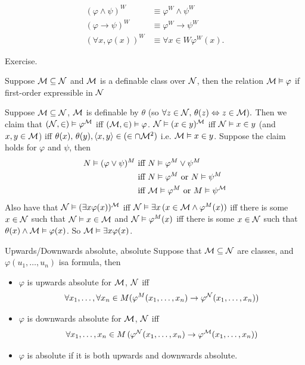 \documentclass{article}
\begin{document}
\begin{fancyprop}{}
    \begin{align*}
        (\varphi \wedge \psi)^{W}      & \equiv \varphi^{W} \wedge \psi^{W}      \\
        (\varphi \rightarrow \psi)^{W} & \equiv \varphi^{W} \rightarrow \psi^{W} \\
        (\forall x, \varphi(x))^{W}    & \equiv \forall x \in W \varphi^{W}(x).
    \end{align*}
\end{fancyprop}
\proof Exercise.
\endproof
\begin{fancyprop}{}
    Suppose $\mathcal{M} \subseteq \mathcal{N}$ and $\mathcal{M}$ is a definable class over $\mathcal{N}$, then the relation $\mathcal{M} \vDash \varphi$ if first-order expressible in $\mathcal{N}$
\end{fancyprop}
\proof Suppose $\mathcal{M} \subseteq \mathcal{N}$, $\mathcal{M}$ is definable by $\theta$ (so $\forall z \in \mathcal{N}, \, \theta(z) \Leftrightarrow z \in \mathcal{M}).$ \gap
Then we claim that $(\mathcal{N}, \in) \vDash \varphi^{\mathcal{M}}$ iff $(\mathcal{M}, \in) \vDash \varphi$. $\mathcal{N} \vDash (x \in y)^{\mathcal{M}}$ iff $\mathcal{N} \vDash x \in y$ (and $x,y \in \mathcal{M}$) iff $\theta(x), \, \theta(y), \langle x, y\rangle \in (\in \cap \mathcal{M}^{2})$ i.e. $\mathcal{M} \vDash x \in y$.\gap
Suppose the claim holds for $\varphi$ and $\psi$, then \begin{align*}
    N \vDash (\varphi \vee \psi)^{M} & \text{ iff } N \vDash \varphi^{M} \vee \psi^{M}                          \\
                                      & \text{ iff } N \vDash \varphi^{M} \text{ or } N \vDash \psi^{M}         \\
                                      & \text{ iff } \mathcal{M} \vDash \varphi^{M} \text{ or } M \vDash \psi^{\mathcal{M}}
\end{align*}
Also have that $\mathcal{N} \vDash (\exists x \varphi(x))^{\mathcal{M}}$ iff $\mathcal{N} \vDash \exists x \, (x \in \mathcal{M} \wedge \varphi^{M}(x))$ iff there is some $x \in \mathcal{N}$ such that $\mathcal{N} \vDash x \in \mathcal{M}$ and $\mathcal{N} \vDash \varphi^{M}(x)$ iff there is some $x \in \mathcal{N}$ such that $\theta(x) \wedge \mathcal{M} \vDash \varphi(x)$.
So $\mathcal{M} \vDash \exists x \varphi(x)$.
\endproof
\begin{fancydefine}{Upwards/Downwards absolute, absolute}
    Suppose that $\mathcal{M} \subseteq \mathcal{N}$ are classes, and $\varphi(u_{1}, \dots, u_{n})$ isa  formula, then
    \begin{itemize}
        \item $\varphi$ is upwards absolute for $\mathcal{M}$, $\mathcal{N}$ iff \[ \forall x_{1}, \dots, \forall x_{n} \in M ( \varphi^{M}(x_{1}, \dots, x_{n}) \rightarrow \varphi^{\mathcal{N}}(x_{1}, \dots, x_{n}))\]
        \item $\varphi$ is downwards absolute for $\mathcal{M}$, $\mathcal{N}$ iff \[ \forall x_{1},\dots,x_{n} \in M\, (\varphi^{\mathcal{N}}(x_{1}, \dots, x_{n}) \rightarrow \varphi^{\mathcal{M}}(x_{1}, \dots, x_{n}))\]
        \item $\varphi$ is absolute if it is both upwards and downwards absolute.
    \end{itemize}
\end{fancydefine}
\end{document}
